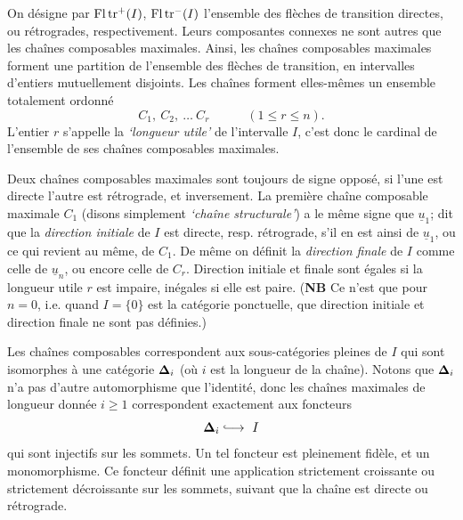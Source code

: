 On désigne par $\operatorname{Fl}\operatorname{tr}^+(I)$, $\operatorname{Fl}\operatorname{tr}^-(I)$ l'ensemble des flèches de transition directes, ou rétrogrades, respectivement. Leurs composantes connexes ne sont autres que les chaînes composables maximales. Ainsi, les chaînes composables maximales forment une partition de l'ensemble des flèches de transition, en intervalles d'entiers mutuellement disjoints. Les chaînes forment elles-mêmes un ensemble totalement ordonné
\[
C_1,\ C_2,\ \ldots\ C_r\qquad\quad(1\leq r\leq n).
\]
L'entier $r$ s'appelle la \textit{‘longueur utile’} de l'intervalle
$I$, c'est donc le cardinal de l'ensemble de ses chaînes composables maximales.

Deux chaînes composables maximales sont toujours de signe opposé, si l'une est directe l'autre est rétrograde, et inversement. La première chaîne composable maximale $C_1$ (disons simplement \textit{‘chaîne structurale’}) a le même signe que $\underline{u}_1$; dit que la \textit{direction initiale} de $I$ est directe, resp. rétrograde, s'il en est ainsi de $\underline{u}_1$, ou ce qui revient au même, de $C_1$. De même on définit la \textit{direction finale} de $I$ comme celle de $\underline{u}_n$, ou encore celle de $C_r$. Direction initiale et finale sont égales si la longueur utile $r$ est
impaire, inégales si elle est paire. (\textbf{NB} Ce n'est que pour $n=0$, i.e. quand $I=\{0\}$ est la catégorie ponctuelle, que direction initiale et direction finale ne sont pas définies.)

Les chaînes composables correspondent aux sous-catégories pleines de $I$ qui sont isomorphes à une catégorie $\boldsymbol{\Delta}_i$ (où $i$ est la longueur de la chaîne). Notons que $\boldsymbol{\Delta}_i$ n'a pas d'autre automorphisme que l'identité, donc les chaînes maximales de longueur donnée $i\geq 1$ correspondent exactement aux foncteurs
\[
\bDelta_i\lhook\joinrel\longrightarrow\ I
\]
qui sont injectifs sur les sommets. Un tel foncteur est pleinement fidèle, et un monomorphisme. Ce foncteur définit une application strictement croissante ou strictement décroissante sur
les sommets, suivant que la chaîne est directe ou rétrograde.

